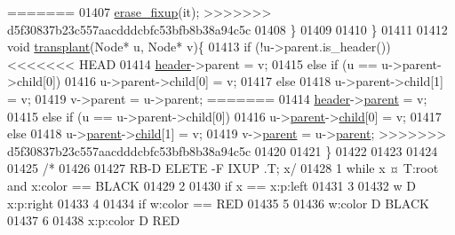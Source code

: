 \begin{DoxyCode}
=======
01407                 \hyperlink{classaed2_1_1map_a7870c8f26e82b00d0aeb2e9f331dfec6_a7870c8f26e82b00d0aeb2e9f331dfec6}{erase\_fixup}(it);
>>>>>>> d5f30837b23c557aacdddcbfc53bfb8b38a94c5c
01408         \}
01409 
01410 \}
01411 
01412     \textcolor{keywordtype}{void} \hyperlink{classaed2_1_1map_a98b9f200c64ce02dfb67902ee00e375a_a98b9f200c64ce02dfb67902ee00e375a}{transplant}(Node* u, Node* v)\{
01413         \textcolor{keywordflow}{if} (!u->parent.is\_header())
<<<<<<< HEAD
01414             \hyperlink{classaed2_1_1map_a92d93f905c8ad73fba18fdc7e8915cce_a92d93f905c8ad73fba18fdc7e8915cce}{header}->parent = v;
01415         \textcolor{keywordflow}{else} if (u == u->parent->child[0])
01416             u->parent->child[0] = v;
01417         \textcolor{keywordflow}{else}
01418             u->parent->child[1] = v;
01419         v->parent = u->parent;
=======
01414             \hyperlink{classaed2_1_1map_a92d93f905c8ad73fba18fdc7e8915cce_a92d93f905c8ad73fba18fdc7e8915cce}{header}->\hyperlink{structaed2_1_1map_1_1Node_a91a1855da19d22344bc89c2f8b998a7a_a91a1855da19d22344bc89c2f8b998a7a}{parent} = v;
01415         \textcolor{keywordflow}{else} if (u == u->parent->child[0])
01416             u->\hyperlink{structaed2_1_1map_1_1Node_a91a1855da19d22344bc89c2f8b998a7a_a91a1855da19d22344bc89c2f8b998a7a}{parent}->\hyperlink{structaed2_1_1map_1_1Node_acac3478cefbd8bebe0c3f3abb9a2935e_acac3478cefbd8bebe0c3f3abb9a2935e}{child}[0] = v;
01417         \textcolor{keywordflow}{else}
01418             u->\hyperlink{structaed2_1_1map_1_1Node_a91a1855da19d22344bc89c2f8b998a7a_a91a1855da19d22344bc89c2f8b998a7a}{parent}->\hyperlink{structaed2_1_1map_1_1Node_acac3478cefbd8bebe0c3f3abb9a2935e_acac3478cefbd8bebe0c3f3abb9a2935e}{child}[1] = v;
01419         v->\hyperlink{structaed2_1_1map_1_1Node_a91a1855da19d22344bc89c2f8b998a7a_a91a1855da19d22344bc89c2f8b998a7a}{parent} = u->\hyperlink{structaed2_1_1map_1_1Node_a91a1855da19d22344bc89c2f8b998a7a_a91a1855da19d22344bc89c2f8b998a7a}{parent};
>>>>>>> d5f30837b23c557aacdddcbfc53bfb8b38a94c5c
01420 
01421     \}
01422 
01423 
01424 
01425 \textcolor{comment}{/*}
01426 \textcolor{comment}{}
01427 \textcolor{comment}{RB-D ELETE -F IXUP .T; x/}
01428 \textcolor{comment}{1 while x ¤ T:root and x:color == BLACK}
01429 \textcolor{comment}{2}
01430 \textcolor{comment}{if x == x:p:left}
01431 \textcolor{comment}{3}
01432 \textcolor{comment}{w D x:p:right}
01433 \textcolor{comment}{4}
01434 \textcolor{comment}{if w:color == RED}
01435 \textcolor{comment}{5}
01436 \textcolor{comment}{w:color D BLACK}
01437 \textcolor{comment}{6}
01438 \textcolor{comment}{x:p:color D RED}

\end{DoxyCode}
